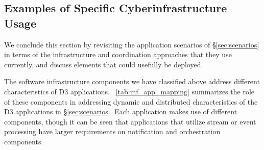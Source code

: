 \subsection{Examples of Specific Cyberinfrastructure Usage}

We conclude this section by revisiting the application scenarios of
\S\ref{sec:scenarios} in terms of the infrastructure and coordination approaches that they use
currently, and discuss elements that could usefully be deployed.

The software infrastructure components we have classified above
address different characteristics of D3
applications. \tablename~\ref{tab:inf_app_mapping} summarizes the role of
these components in addressing dynamic and distributed characteristics
of the D3 applications in \S\ref{sec:scenarios}. Each application makes use of different components, though it can be seen that applications that utilize stream or event processing %
have larger requirements on notification and orchestration components.


